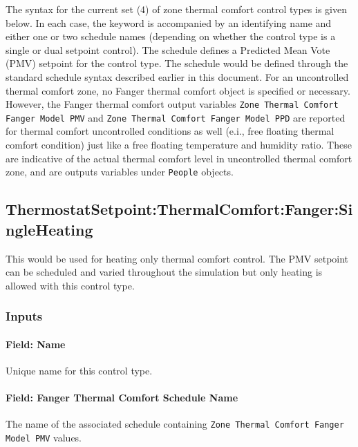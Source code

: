 The syntax for the current set (4) of zone thermal comfort control types is given below. In each case, the keyword is accompanied by an identifying name and either one or two schedule names (depending on whether the control type is a single or dual setpoint control). The schedule defines a Predicted Mean Vote (PMV) setpoint for the control type. The schedule would be defined through the standard schedule syntax described earlier in this document. For an uncontrolled thermal comfort zone, no Fanger thermal comfort object is specified or necessary. However, the Fanger thermal comfort output variables \lstinline!Zone Thermal Comfort Fanger Model PMV! and \lstinline!Zone Thermal Comfort Fanger Model PPD! are reported for thermal comfort uncontrolled conditions as well (e.i., free floating thermal comfort condition) just like a free floating temperature and humidity ratio.   These are indicative of the actual thermal comfort level in uncontrolled thermal comfort zone, and are outputs variables under \lstinline!People! objects.

\subsection{ThermostatSetpoint:ThermalComfort:Fanger:SingleHeating}\label{thermostatsetpointthermalcomfortfangersingleheating}

This would be used for heating only thermal comfort control. The PMV setpoint can be scheduled and varied throughout the simulation but only heating is allowed with this control type.

\subsubsection{Inputs}\label{inputs-10-023}

\paragraph{Field: Name}\label{field-name-8-024}

Unique name for this control type.

\paragraph{Field: Fanger Thermal Comfort Schedule Name}\label{field-fanger-thermal-comfort-schedule-name}

The name of the associated schedule containing \lstinline!Zone Thermal Comfort Fanger Model PMV! values.

